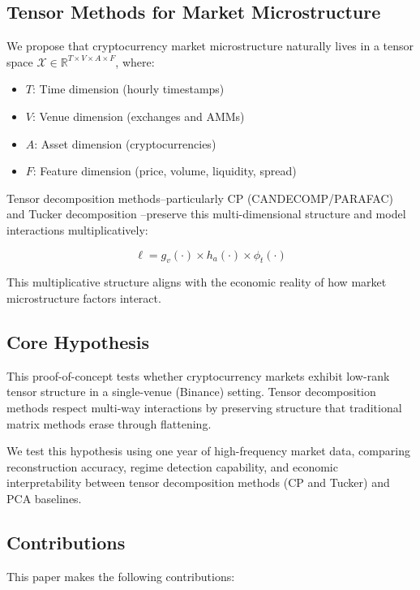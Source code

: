 \documentclass[11pt,twocolumn]{article}
\begin{document}
\subsection{Tensor Methods for Market Microstructure}

We propose that cryptocurrency market microstructure naturally lives in a tensor space $\mathcal{X} \in \mathbb{R}^{T \times V \times A \times F}$, where:

\begin{itemize}[leftmargin=*]
    \item $T$: Time dimension (hourly timestamps)
    \item $V$: Venue dimension (exchanges and AMMs)
    \item $A$: Asset dimension (cryptocurrencies)
    \item $F$: Feature dimension (price, volume, liquidity, spread)
\end{itemize}

Tensor decomposition methods--particularly CP (CANDECOMP/PARAFAC) \citep{Kolda2009Tensor} and Tucker decomposition \citep{Tucker1966Some,DeLathauwer2000Multilinear}--preserve this multi-dimensional structure and model interactions multiplicatively:

$$\ell = g_{v}(\cdot) \times h_{a}(\cdot) \times \phi_{t}(\cdot)$$

This multiplicative structure aligns with the economic reality of how market microstructure factors interact.

\subsection{Core Hypothesis}

This proof-of-concept tests whether cryptocurrency markets exhibit low-rank tensor structure in a single-venue (Binance) setting. Tensor decomposition methods respect multi-way interactions by preserving structure that traditional matrix methods erase through flattening.

We test this hypothesis using one year of high-frequency market data, comparing reconstruction accuracy, regime detection capability, and economic interpretability between tensor decomposition methods (CP and Tucker) and PCA baselines.

\subsection{Contributions}

This paper makes the following contributions:
\end{document}
